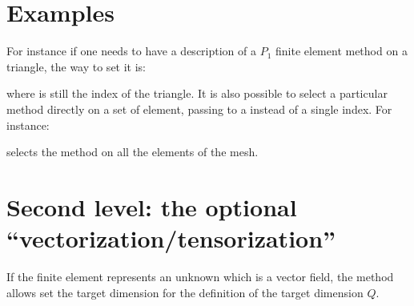 \documentclass[a4paper,11pt,english]{sphinxmanual}
\begin{document}
\section{Examples}
\label{\detokenize{userdoc/bfem:examples}}
For instance if one needs to have a description of a \(P_1\) finite element
method on a triangle, the way to set it is:

\begin{sphinxVerbatim}[commandchars=\\\{\}]
 
\end{sphinxVerbatim}

where  is still the index of the triangle. It is also possible to select a
particular method directly on a set of element, passing to
 a  instead of a single index. For instance:

\begin{sphinxVerbatim}[commandchars=\\\{\}]
\end{sphinxVerbatim}

selects the method on all the elements of the mesh.


\section{Second level: the optional “vectorization/tensorization”}
\label{\detokenize{userdoc/bfem:second-level-the-optional-vectorization-tensorization}}
If the finite element represents an unknown which is a vector field, the method  allows set the target dimension for the definition of the
target dimension \(Q\).
\end{document}

